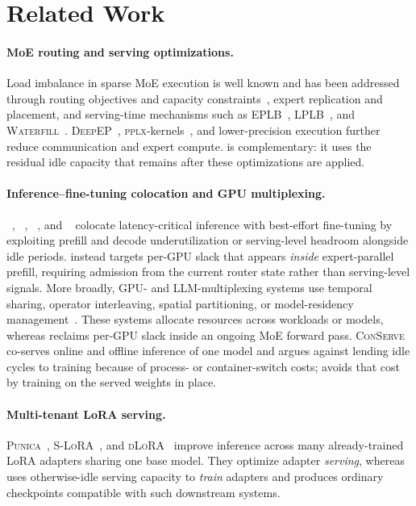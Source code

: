 \section{Related Work}
\label{sec:related}

\paragraph{MoE routing and serving optimizations.}
Load imbalance in sparse \ac{MoE} execution is well known and has been addressed through routing objectives and capacity constraints~\cite{switch,gshard}, expert replication and placement, and
serving-time mechanisms such as \textsc{EPLB}~\cite{eplb}, \textsc{LPLB}~\cite{lplb}, and \textsc{Waterfill}~\cite{waterfill}.
\textsc{DeepEP}~\cite{deepep}, \textsc{pplx}-kernels~\cite{pplxkernels}, and lower-precision execution further reduce communication and expert compute.
\sys is complementary: it uses the residual idle capacity that remains after these optimizations are applied.

\paragraph{Inference--fine-tuning colocation and GPU multiplexing.}
\flexllm~\cite{flexllm}, \llmstation~\cite{llmstation},
\harli~\cite{harli}, and \deltaserve~\cite{deltaserve} colocate latency-critical inference with best-effort fine-tuning by exploiting prefill and decode underutilization or serving-level headroom alongside idle periods.
\sys instead targets per-GPU slack that appears \emph{inside} expert-parallel prefill, requiring admission from the current router state rather than serving-level signals.
More broadly, GPU- and LLM-multiplexing systems use temporal sharing, operator interleaving, spatial partitioning, or model-residency management~\cite{gandiva,antman,orion,nvidiamps,nvidiamig,
muxserve,qlm,serverlessllm,aegaeon,prism}.
These systems allocate resources across workloads or models, whereas \sys reclaims per-GPU slack inside an ongoing \ac{MoE} forward pass.
\textsc{ConServe}~\cite{conserve} co-serves online and offline inference of one model and argues against lending idle cycles to training because of process- or container-switch costs; \sys avoids that cost by training on the served weights in place.

\paragraph{Multi-tenant \ac{LoRA} serving.}
\textsc{Punica}~\cite{punica}, \textsc{S-LoRA}~\cite{slora}, and \textsc{dLoRA}~\cite{dlora}
improve inference across many already-trained \ac{LoRA} adapters sharing one base model.
They optimize adapter \emph{serving}, whereas \sys uses otherwise-idle serving capacity to \emph{train} adapters and produces ordinary checkpoints compatible with such downstream systems.
